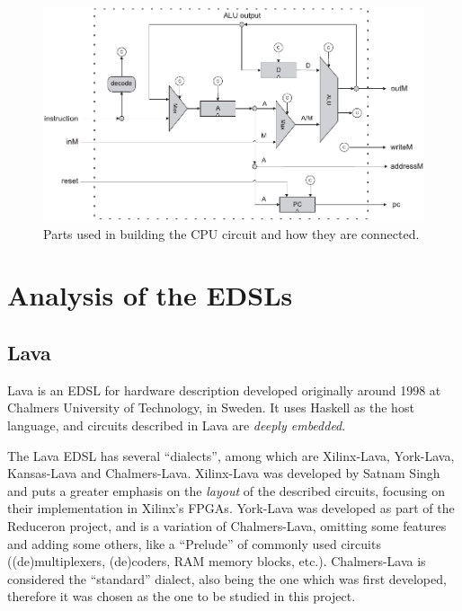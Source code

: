 \documentclass[a4paper]{article}
\begin{document}
            \begin{figure}[h!]
                \begin{center}
                    \includegraphics[width=1.0\textwidth]{imgs/cpu-parts.pdf}
                \end{center}
                \caption{Parts used in building the CPU circuit and how they are connected.
                    \label{fig:cpu-parts}}
            \end{figure}

    \section{Analysis of the EDSLs}
    \label{sec:edsls}

        \subsection{Lava}
        \label{subsec:lava}
            Lava\cite{lava1998} is an EDSL for hardware description developed originally around 1998
            at Chalmers University of Technology, in Sweden. It uses Haskell as the host language,
            and circuits described in Lava are \emph{deeply embedded}.

            The Lava EDSL has several ``dialects'', among which are Xilinx-Lava, York-Lava,
            Kansas-Lava and Chalmers-Lava. Xilinx-Lava\cite{xilinx-lava} was developed by Satnam
            Singh and puts a greater emphasis on the \emph{layout} of the described circuits,
            focusing on their implementation in Xilinx's FPGAs. York-Lava was developed as part of
            the Reduceron\cite{reduceron} project, and is a variation of Chalmers-Lava, omitting
            some features and adding some others, like a ``Prelude'' of commonly used circuits
            ((de)multiplexers, (de)coders, RAM memory blocks, etc.). Chalmers-Lava is considered the
            ``standard'' dialect, also being the one which was first developed, therefore it was
            chosen as the one to be studied in this project.
\end{document}
